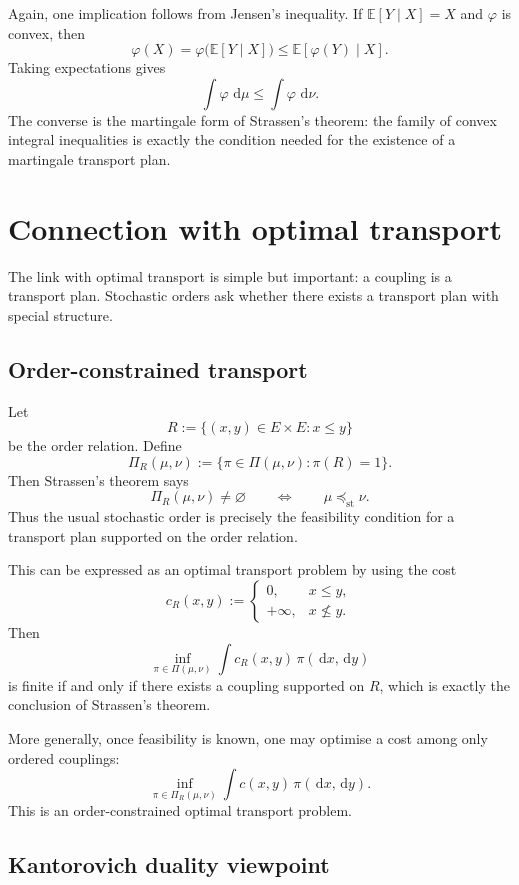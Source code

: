 \documentclass[11pt]{article}
\newcommand{\E}{\mathbb E}
\newcommand{\dd}{\,\mathrm d}
\newcommand{\PiC}{\Pi}
\begin{document}
Again, one implication follows from Jensen's inequality. If \(\E[Y\mid X]=X\)
and \(\varphi\) is convex, then
\[
        \varphi(X)
        =
        \varphi\bigl(\E[Y\mid X]\bigr)
        \leq
        \E[\varphi(Y)\mid X].
\]
Taking expectations gives
\[
        \int \varphi\,\dd\mu
        \leq
        \int \varphi\,\dd\nu.
\]
The converse is the martingale form of Strassen's theorem: the family of convex
integral inequalities is exactly the condition needed for the existence of a
martingale transport plan.

\section{Connection with optimal transport}

The link with optimal transport is simple but important: a coupling is a
transport plan. Stochastic orders ask whether there exists a transport plan with
special structure.

\subsection{Order-constrained transport}

Let
\[
        R:=\{(x,y)\in E\times E:x\leq y\}
\]
be the order relation. Define
\[
        \PiC_R(\mu,\nu)
        :=
        \{\pi\in\PiC(\mu,\nu):\pi(R)=1\}.
\]
Then Strassen's theorem says
\[
        \PiC_R(\mu,\nu)\neq\varnothing
        \qquad\Longleftrightarrow\qquad
        \mu\preceq_{\mathrm{st}}\nu.
\]
Thus the usual stochastic order is precisely the feasibility condition for a
transport plan supported on the order relation.

This can be expressed as an optimal transport problem by using the cost
\[
        c_R(x,y)
        :=
        \begin{cases}
        0, & x\leq y,\\
        +\infty, & x\not\leq y.
        \end{cases}
\]
Then
\[
        \inf_{\pi\in\PiC(\mu,\nu)}
        \int c_R(x,y)\,\pi(\dd x,\dd y)
\]
is finite if and only if there exists a coupling supported on \(R\), which is
exactly the conclusion of Strassen's theorem.

More generally, once feasibility is known, one may optimise a cost among only
ordered couplings:
\[
        \inf_{\pi\in\PiC_R(\mu,\nu)}
        \int c(x,y)\,\pi(\dd x,\dd y).
\]
This is an order-constrained optimal transport problem.

\subsection{Kantorovich duality viewpoint}
\end{document}
